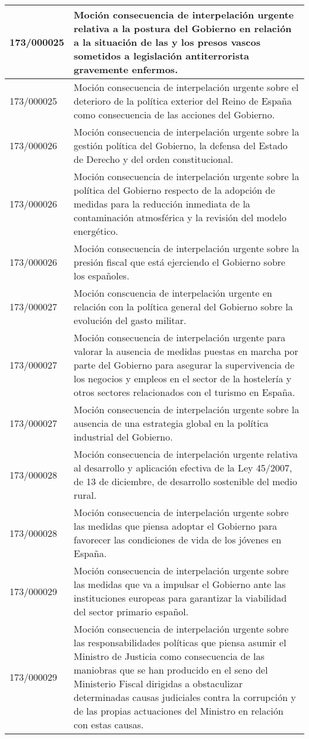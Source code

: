 {\begin{table}[H]
\begin{center}
\begin{tabularx}{\linewidth}{| l | X |}
\hline
173/000025 & Moción consecuencia de interpelación urgente relativa a la postura del Gobierno en relación a la situación de las y los presos vascos sometidos a legislación antiterrorista gravemente enfermos. \\
\hline
173/000025 & Moción consecuencia de interpelación urgente sobre el deterioro de la política exterior del Reino de España como consecuencia de las acciones del Gobierno. \\
\hline
173/000026 & Moción consecuencia de interpelación urgente sobre la gestión política del Gobierno, la defensa del Estado de Derecho y del orden constitucional. \\
\hline
173/000026 & Moción consecuencia de interpelación urgente sobre la política del Gobierno respecto de la adopción de medidas para la reducción inmediata de la contaminación atmosférica y la revisión del modelo energético. \\
\hline
173/000026 & Moción consecuencia de interpelación urgente sobre la presión fiscal que está ejerciendo el Gobierno sobre los españoles. \\
\hline
173/000027 & Moción conscuencia de interpelación urgente en relación con la política general del Gobierno sobre la evolución del gasto militar. \\
\hline
173/000027 & Moción consecuencia de interpelación urgente para valorar la ausencia de medidas puestas en marcha por parte del Gobierno para asegurar la supervivencia de los negocios y empleos en el sector de la hostelería y otros sectores relacionados con el turismo en España. \\
\hline
173/000027 & Moción consecuencia de interpelación urgente sobre la ausencia de una estrategia global en la política industrial del Gobierno. \\
\hline
173/000028 & Moción consecuencia de interpelación urgente relativa al desarrollo y aplicación efectiva de la Ley 45/2007, de 13 de diciembre, de desarrollo sostenible del medio rural. \\
\hline
173/000028 & Moción consecuencia de interpelación urgente sobre las medidas que piensa adoptar el Gobierno para favorecer las condiciones de vida de los jóvenes en España. \\
\hline
173/000029 & Moción consecuencia de interpelación urgente sobre las medidas que va a impulsar el Gobierno ante las instituciones europeas para garantizar la viabilidad del sector primario español. \\
\hline
173/000029 & Moción consecuencia de interpelación urgente sobre las responsabilidades políticas que piensa asumir el Ministro de Justicia como consecuencia de las maniobras que se han producido en el seno del Ministerio Fiscal dirigidas a obstaculizar determinadas causas judiciales contra la corrupción y de las propias actuaciones del Ministro en relación con estas causas. \\

\end{tabularx}
\end{center}
\end{table}}
